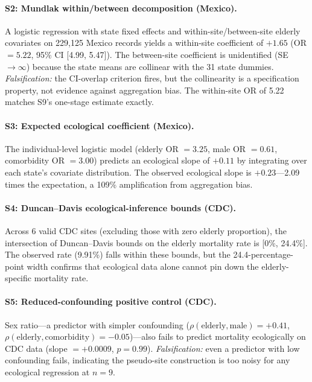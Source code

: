 \documentclass[11pt]{article}
\begin{document}
\paragraph{S2: Mundlak within/between decomposition (Mexico).}
A logistic regression with state fixed effects and within-site/between-site
elderly covariates on 229{,}125 Mexico records yields a within-site
coefficient of $+1.65$ (OR $= 5.22$, 95\% CI [4.99, 5.47]).  The
between-site coefficient is unidentified (SE $\to \infty$) because the
state means are collinear with the 31 state dummies.
\emph{Falsification:} the CI-overlap criterion fires, but the collinearity
is a specification property, not evidence against aggregation bias.
The within-site OR of 5.22 matches S9's one-stage estimate exactly.

\paragraph{S3: Expected ecological coefficient (Mexico).}
The individual-level logistic model (elderly OR $= 3.25$, male
OR $= 0.61$, comorbidity OR $= 3.00$) predicts an ecological slope
of $+0.11$ by integrating over each state's covariate distribution.
The observed ecological slope is $+0.23$---2.09 times the expectation,
a 109\% amplification from aggregation bias.

\paragraph{S4: Duncan--Davis ecological-inference bounds (CDC).}
Across 6 valid CDC sites (excluding those with zero elderly proportion),
the intersection of Duncan--Davis bounds on the elderly mortality rate
is [0\%, 24.4\%].  The observed rate (9.91\%) falls within these bounds,
but the 24.4-percentage-point width confirms that ecological data alone
cannot pin down the elderly-specific mortality rate.

\paragraph{S5: Reduced-confounding positive control (CDC).}
Sex ratio---a predictor with simpler confounding
($\rho(\text{elderly}, \text{male}) = +0.41$,
$\rho(\text{elderly}, \text{comorbidity}) = -0.05$)---also fails
to predict mortality ecologically on CDC data (slope $= +0.0009$,
$p = 0.99$).  \emph{Falsification:} even a predictor with low
confounding fails, indicating the pseudo-site construction is too
noisy for any ecological regression at $n = 9$.
\end{document}
